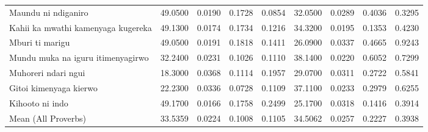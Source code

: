 \begin{table}
\begin{tabular}{lrrrrrrrr}
        Maundu ni ndiganiro                              & 49.0500                                 & 0.0190                                  & 0.1728 & 0.0854 & 32.0500   & 0.0289   & 0.4036 & 0.3295 \\
        Kahii ka mwathi kamenyaga kugereka               & 49.1300                                 & 0.0174                                  & 0.1734 & 0.1216 & 34.3200   & 0.0195   & 0.1353 & 0.4230 \\
        Mburi ti marigu                                  & 49.0500                                 & 0.0191                                  & 0.1818 & 0.1411 & 26.0900   & 0.0337   & 0.4665 & 0.9243 \\
        Mundu muka na iguru itimenyagirwo                & 32.2400                                 & 0.0231                                  & 0.1026 & 0.1110 & 38.1400   & 0.0220   & 0.6052 & 0.7299 \\
        Muhoreri ndari ngui                              & 18.3000                                 & 0.0368                                  & 0.1114 & 0.1957 & 29.0700   & 0.0311   & 0.2722 & 0.5841 \\
        Gitoi kimenyaga kierwo                           & 22.2300                                 & 0.0336                                  & 0.0728 & 0.1109 & 37.1100   & 0.0233   & 0.2979 & 0.6255 \\
        Kihooto ni indo                                  & 49.1700                                 & 0.0166                                  & 0.1758 & 0.2499 & 25.1700   & 0.0318   & 0.1416 & 0.3914 \\
        Mean (All Proverbs)                              & 33.5359                                 & 0.0224                                  & 0.1008 & 0.1105 & 34.5062   & 0.0257   & 0.2227 & 0.3938 \\
        \bottomrule
    \end{tabular}
\end{table}